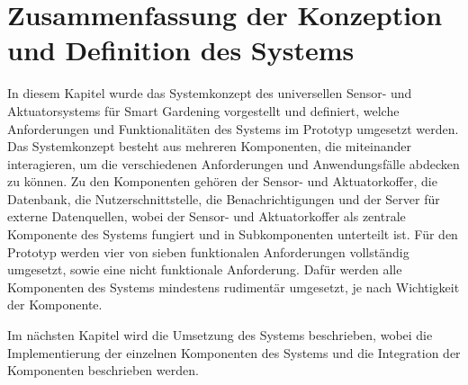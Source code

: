 \section{Zusammenfassung der Konzeption und Definition des Systems}
In diesem Kapitel wurde das Systemkonzept des universellen Sensor- und Aktuatorsystems für Smart Gardening vorgestellt und definiert, welche Anforderungen und Funktionalitäten des Systems im Prototyp umgesetzt werden.
Das Systemkonzept besteht aus mehreren Komponenten, die miteinander interagieren, um die verschiedenen Anforderungen und Anwendungsfälle abdecken zu können.
Zu den Komponenten gehören der Sensor- und Aktuatorkoffer, die Datenbank, die Nutzerschnittstelle, die Benachrichtigungen und der Server für externe Datenquellen, wobei der Sensor- und Aktuatorkoffer als zentrale Komponente des Systems fungiert und in Subkomponenten unterteilt ist.
Für den Prototyp werden vier von sieben funktionalen Anforderungen vollständig umgesetzt, sowie eine nicht funktionale Anforderung.
Dafür werden alle Komponenten des Systems mindestens rudimentär umgesetzt, je nach Wichtigkeit der Komponente.

Im nächsten Kapitel wird die Umsetzung des Systems beschrieben, wobei die Implementierung der einzelnen Komponenten des Systems und die Integration der Komponenten beschrieben werden.